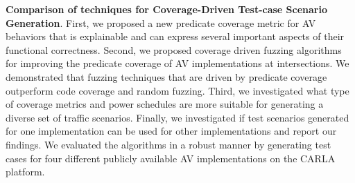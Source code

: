 \textbf{Comparison of techniques for Coverage-Driven Test-case Scenario Generation}.
First, we proposed a new predicate coverage metric for AV behaviors that is explainable and can express several important aspects of their functional correctness.
% 
Second, we proposed coverage driven fuzzing algorithms for improving the predicate coverage of AV implementations at intersections.
% 
We demonstrated that fuzzing techniques that are driven by predicate coverage outperform code coverage and random fuzzing.
% 
Third, we investigated what type of coverage metrics and power schedules are more suitable for generating a diverse set of traffic scenarios.
% 
Finally, we investigated if test scenarios generated for one implementation can be used for other implementations and report our findings.
% 
We evaluated the algorithms in a robust manner by generating test cases for four different publicly available AV implementations on the CARLA platform.